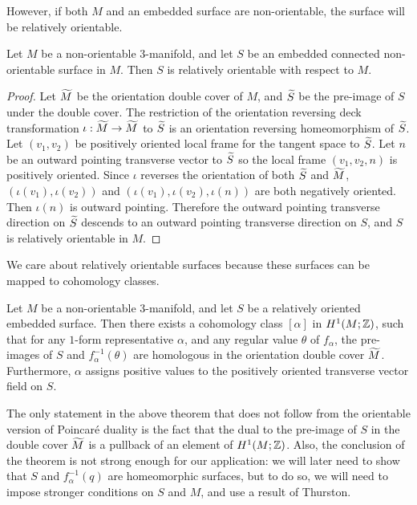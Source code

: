 However, if both $M$ and an embedded surface are non-orientable, the surface will be relatively orientable.
\begin{prop}
  \label{prop:relative-orientability}
  Let $M$ be a non-orientable $3$-manifold, and let $S$ be an embedded connected non-orientable surface in $M$.
  Then $S$ is relatively orientable with respect to $M$.
\end{prop}
\begin{proof}
  Let $\widetilde{M}$ be the orientation double cover of $M$, and $\widetilde{S}$ be the pre-image of $S$ under the double cover.
  The restriction of the orientation reversing deck transformation $\iota:\widetilde{M}\rightarrow\widetilde{M}$ to $\widetilde{S}$ is an orientation reversing homeomorphism of $\widetilde{S}$.
  Let $(v_1, v_2)$ be positively oriented local frame for the tangent space to $\widetilde{S}$.
  Let $n$ be an outward pointing transverse vector to $\widetilde{S}$ so the local frame $(v_1, v_2, n)$ is positively oriented.
  Since $\iota$ reverses the orientation of both $\widetilde{S}$ and $\widetilde{M}$, $(\iota(v_1), \iota(v_2))$ and $(\iota(v_1), \iota(v_2), \iota(n))$ are both negatively oriented.
  Then $\iota(n)$ is outward pointing.
  Therefore the outward pointing transverse direction on $\widetilde{S}$ descends to an outward pointing transverse direction on $S$, and $S$ is relatively orientable in $M$.
\end{proof}

We care about relatively orientable surfaces because these surfaces can be mapped to cohomology classes.
\begin{thm}
  \label{thm:Poincare-duality}
  Let $M$ be a non-orientable $3$-manifold, and let $S$ be a relatively oriented embedded surface.
  Then there exists a cohomology class $[\alpha]$ in $H^1(M; \mathbb{Z})$, such that for any $1$-form representative $\alpha$, and any regular value $\theta$ of $f_{\alpha}$, the pre-images of $S$ and $f_{\alpha}^{-1}(\theta)$ are homologous in the orientation double cover $\widetilde{M}$.
  Furthermore, $\alpha$ assigns positive values to the positively oriented transverse vector field on $S$.
\end{thm}
\begin{rem}
  The only statement in the above theorem that does not follow from the orientable version of Poincar\'e duality is the fact that the dual to the pre-image of $S$ in the double cover $\widetilde{M}$ is a pullback of an element of $H^1(M; \mathbb{Z})$. Also, the conclusion of the theorem is not strong enough for our application: we will later need to show that $S$ and $f_{\alpha}^{-1}(q)$ are homeomorphic surfaces, but to do so, we will need to impose stronger conditions on $S$ and $M$, and use a result of Thurston.
\end{rem}

